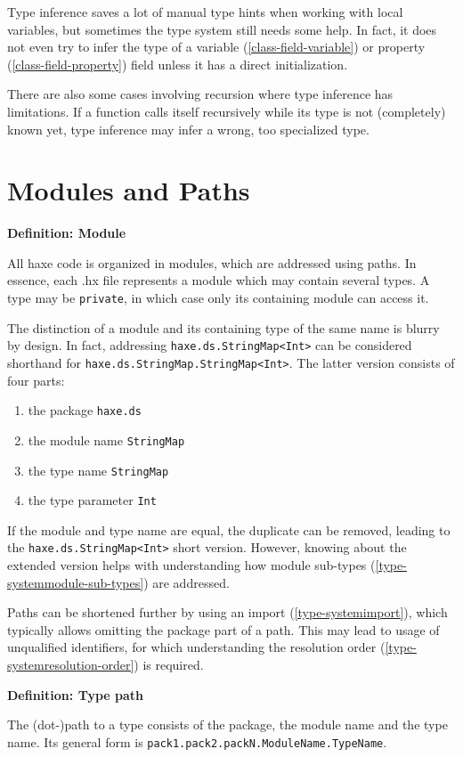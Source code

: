 \documentclass[a4paper,oneside]{book}
\newcommand{\type}[1]{\texttt{#1}}
\newcommand{\expr}[1]{\texttt{#1}}
\newenvironment{myshaded}
  {\def\FrameCommand{\fboxsep=\topsep\colorbox{bgcolor}}%
  \MakeFramed {\advance\hsize-\width \FrameRestore}}%
 {\endMakeFramed}
\newcommand{\define}[3][Definition]
	{\begin{myshaded}\noindent\textbf{#1: #2}\par\nobreak\noindent\ignorespaces#3\label{def:#2}\end{myshaded}}
\newcommand{\tref}[2]{#1 (\ref{#2})}
\begin{document}
Type inference saves a lot of manual type hints when working with local variables, but sometimes the type system still needs some help. In fact, it does not even try to infer the type of a \tref{variable}{class-field-variable} or \tref{property}{class-field-property} field unless it has a direct initialization.

There are also some cases involving recursion where type inference has limitations. If a function calls itself recursively while its type is not (completely) known yet, type inference may infer a wrong, too specialized type.




\section{Modules and Paths}
\label{type-systemmodules-and-paths}

\define{Module}{All haxe code is organized in modules, which are addressed using paths. In essence, each .hx file represents a module which may contain several types. A type may be \expr{private}, in which case only its containing module can access it.}

The distinction of a module and its containing type of the same name is blurry by design. In fact, addressing \expr{haxe.ds.StringMap<Int>} can be considered shorthand for \expr{haxe.ds.StringMap.StringMap<Int>}. The latter version consists of four parts:

\begin{enumerate}
	\item the package \expr{haxe.ds}
	\item the module name \expr{StringMap}
	\item the type name \type{StringMap}
	\item the type parameter \type{Int}
\end{enumerate}
If the module and type name are equal, the duplicate can be removed, leading to the \expr{haxe.ds.StringMap<Int>} short version. However, knowing about the extended version helps with understanding how \tref{module sub-types}{type-systemmodule-sub-types} are addressed.

Paths can be shortened further by using an \tref{import}{type-systemimport}, which typically allows omitting the package part of a path. This may lead to usage of unqualified identifiers, for which understanding the \tref{resolution order}{type-systemresolution-order} is required.

\define{Type path}{The (dot-)path to a type consists of the package, the module name and the type name. Its general form is \expr{pack1.pack2.packN.ModuleName.TypeName}.} 
\end{document}
